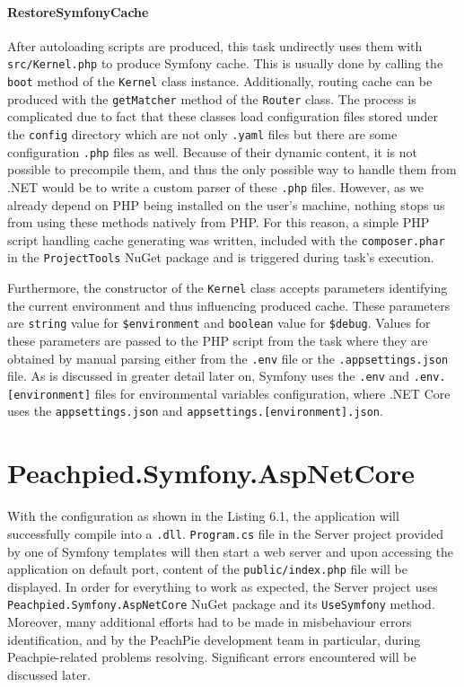 \paragraph{RestoreSymfonyCache} After autoloading scripts are produced, this task undirectly uses them with \texttt{src/Kernel.php} to produce Symfony cache. This is usually done by calling the \texttt{boot} method of the \texttt{Kernel} class instance. Additionally, routing cache can be produced with the \texttt{getMatcher} method of the \texttt{Router} class. The process is complicated due to fact that these classes load configuration files stored under the \texttt{config} directory which are not only \texttt{.yaml} files but there are some configuration \texttt{.php} files as well. Because of their dynamic content, it is not possible to precompile them, and thus the only possible way to handle them from .NET would be to write a custom parser of these \texttt{.php} files. However, as we already depend on PHP being installed on the user's machine, nothing stops us from using these methods natively from PHP. For this reason, a simple PHP script handling cache generating was written, included with the \texttt{composer.phar} in the \texttt{ProjectTools} NuGet package and is triggered during task's execution.

Furthermore, the constructor of the \texttt{Kernel} class accepts parameters identifying the current environment and thus influencing produced cache. These parameters are \texttt{string} value for \texttt{\$environment} and \texttt{boolean} value for \texttt{\$debug}. Values for these parameters are passed to the PHP script from the task where they are obtained by manual parsing either from the \texttt{.env} file or the \texttt{.appsettings.json} file. As is discussed in greater detail later on, Symfony uses the \texttt{.env} and \texttt{.env.[environment]} files for environmental variables configuration, where .NET Core uses the \texttt{appsettings.json} and \texttt{appsettings.[environment].json}.
 
 
\section{Peachpied.Symfony.AspNetCore}
With the configuration as shown in the Listing 6.1, the application will successfully compile into a \texttt{.dll}. \texttt{Program.cs} file in the Server project provided by one of Symfony templates will then start a web server and upon accessing the application on default port, content of the \texttt{public/index.php} file will be displayed. In order for everything to work as expected, the Server project uses \texttt{Peachpied.Symfony.AspNetCore} NuGet package and its \texttt{UseSymfony} method. Moreover, many additional efforts had to be made in misbehaviour errors identification, and by the PeachPie development team in particular, during Peachpie-related problems resolving. Significant errors encountered will be discussed later.

